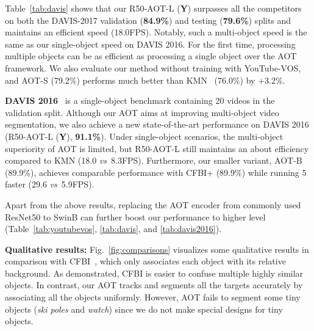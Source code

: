 \documentclass{article}
\def\vs{\emph{vs}~}
\newcommand{\zongxin}[1]{#1}
\begin{document}
Table~\ref{tab:davis} shows that our R50-AOT-L (\textbf{Y}) surpasses all the competitors on both the DAVIS-2017 validation (\textbf{84.9\%}) and testing (\textbf{79.6\%}) splits and maintains an efficient speed (18.0FPS). Notably, such a multi-object speed is the same as our single-object speed on DAVIS 2016. For the first time, processing multiple objects can be as efficient as processing a single object over the AOT framework. We also evaluate our method without training with YouTube-VOS, and AOT-S (79.2\%) performs much better than KMN~\cite{KMN} (76.0\%) by +3.2\%.


\noindent \textbf{DAVIS 2016}~\cite{davis2016} is a single-object benchmark containing 20 videos in the validation split. Although our AOT aims at improving multi-object video segmentation, we also achieve a new state-of-the-art performance on DAVIS 2016 (R50-AOT-L (\textbf{Y}), \textbf{91.1\%}). Under single-object scenarios, the multi-object superiority of AOT is limited, but R50-AOT-L still maintains an about  efficiency compared to KMN (18.0 \vs 8.3FPS). Furthermore, our smaller variant, AOT-B (89.9\%), achieves comparable performance with CFBI+ (89.9\%) while running 5 faster (29.6 \vs 5.9FPS).

Apart from the above results, replacing the AOT encoder from commonly used ResNet50 to SwinB can further boost our performance to higher level (Table~\ref{tab:youtubevos}, \ref{tab:davis}, and \ref{tab:davis2016}).


\zongxin{\noindent\textbf{Qualitative results:} Fig.~\ref{fig:comparisons} visualizes some qualitative results in comparison with CFBI~\cite{cfbi}, which only associates each object with its relative background. As demonstrated, CFBI is easier to confuse multiple highly similar objects. In contrast, our AOT tracks and segments all the targets accurately by associating all the objects uniformly. However, AOT fails to segment some tiny objects (\textit{ski poles} and \textit{watch}) since we do not make special designs for tiny objects.}
\end{document}

